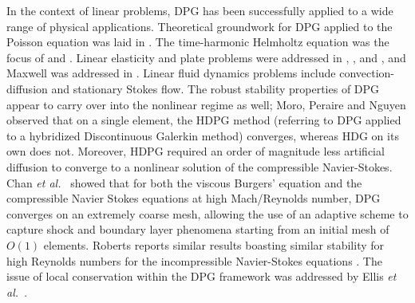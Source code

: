 \documentclass[letterpaper,12pt]{article}
\def\etal{{\it et al.~}}
\begin{document}
In the context of linear problems, DPG has been successfully applied to a wide range of physical applications.  
Theoretical groundwork for DPG applied to the Poisson equation was laid in \cite{DPGPoisson}.  The time-harmonic Helmholtz equation was the focus of \cite{DPGHelmholtz, Gopalakrishnan2014} and \cite{DPG4}.  Linear elasticity and plate problems were addressed in \cite{BramwellDPG}, \cite{NiemiBramwellDemkowicz10}, and \cite{BramwellDemkowiczQiu10}, and Maxwell was addressed in \cite{DPGCloaking, WohlmuthReport}.  Linear fluid dynamics problems include convection-diffusion \cite{DPG3,DemkowiczHeuer,ChanHeuerThanhDemkowicz2012,Chan2013,EllisLC} and stationary Stokes flow\cite{DPGStokes,EllisLC}.
The robust stability properties of DPG appear to carry over into the nonlinear regime as well; Moro, Peraire and Nguyen observed \cite{MoroNguyenPeraire11, MoroMastersThesis} that on a single element, the HDPG method (referring to DPG applied to a hybridized Discontinuous Galerkin method) converges, whereas HDG on its own does not.  Moreover, HDPG required an order of magnitude less artificial diffusion to converge to a nonlinear solution of the compressible Navier-Stokes.  Chan \etal \cite{Chan2013dpg} showed that for both the viscous Burgers' equation and the compressible Navier Stokes equations at high Mach/Reynolds number, DPG converges on an extremely coarse mesh, allowing the use of an adaptive scheme to capture shock and boundary layer phenomena starting from an initial mesh of $O(1)$ elements.  Roberts reports similar results boasting similar stability for high Reynolds numbers for the incompressible Navier-Stokes equations \cite{NateDissertation}.  
The issue of local conservation within the DPG framework was addressed by Ellis \etal \cite{EllisLC}.
\end{document}
